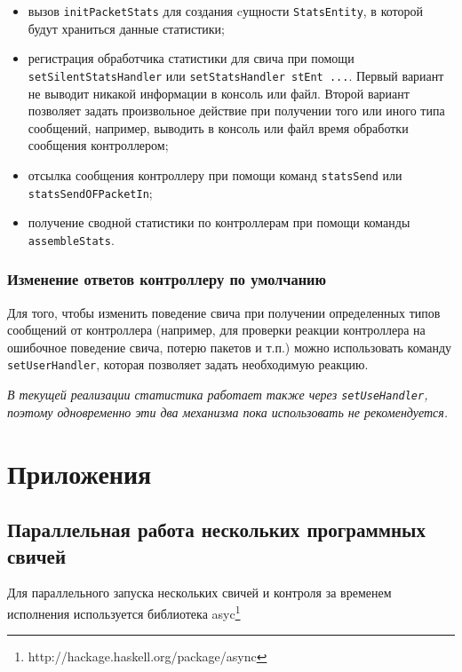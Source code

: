 \documentclass[9pt,a4paper]{article}
\begin{document}
\begin{itemize}
  \item вызов \lstinline!initPacketStats! для создания cущности \lstinline!StatsEntity!,
    в которой будут храниться данные статистики;
  \item регистрация обработчика статистики для свича при помощи 
    \lstinline!setSilentStatsHandler! или \lstinline!setStatsHandler stEnt ...!.
    Первый вариант не выводит никакой информации в консоль или файл.
    Второй вариант позволяет задать произвольное действие при получении того или иного типа сообщений, например, выводить в консоль или файл время обработки сообщения контроллером;
  \item отсылка сообщения контроллеру при помощи команд \lstinline!statsSend! или
    \lstinline!statsSendOFPacketIn!;
  \item получение сводной статистики по контроллерам при помощи команды
    \lstinline!assembleStats!.
\end{itemize}

\subsubsection{Изменение ответов контроллеру по умолчанию}

Для того, чтобы изменить поведение свича при получении определенных типов сообщений от контроллера (например, для
проверки реакции контроллера на ошибочное поведение свича, потерю пакетов и т.п.)
можно использовать команду \lstinline!setUserHandler!, которая позволяет задать
необходимую реакцию.

\emph{В текущей реализации статистика работает также через \lstinline!setUseHandler!,
поэтому одновременно эти два механизма пока использовать не рекомендуется.}

\section{Приложения}

\subsection{Параллельная работа нескольких программных свичей}

Для параллельного запуска нескольких свичей и контроля за временем исполнения
используется библиотека asyc\footnote{http://hackage.haskell.org/package/async}
\end{document}
